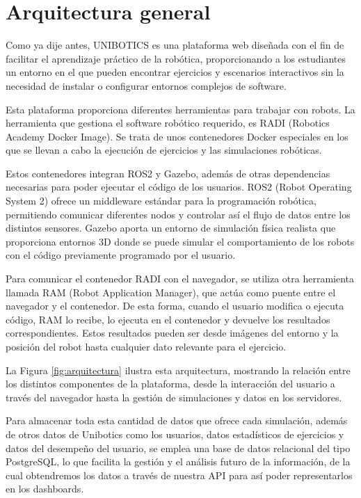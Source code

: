 \documentclass[a4paper, 12pt]{book}
\begin{document}
\section{Arquitectura general} 
\label{sec:arquitectura}

Como ya dije antes, UNIBOTICS es una plataforma web diseñada con el fin de facilitar el aprendizaje práctico de la robótica, proporcionando a los estudiantes un entorno en el que pueden encontrar ejercicios y escenarios interactivos sin la necesidad de instalar o configurar entornos complejos de software.

Esta plataforma proporciona diferentes herramientas para trabajar con robots. La herramienta que gestiona el software robótico requerido, es RADI (Robotics Academy Docker Image). Se trata de unos contenedores Docker especiales en los que se llevan a cabo la ejecución de ejercicios y las simulaciones robóticas.

Estos contenedores integran ROS2 y Gazebo, además de otras dependencias necesarias para poder ejecutar el código de los usuarios. ROS2 (Robot Operating System 2) ofrece un middleware estándar para la programación robótica, permitiendo comunicar diferentes nodos y controlar así el flujo de datos entre los distintos sensores. Gazebo aporta un entorno de simulación física realista que proporciona entornos 3D donde se puede simular el comportamiento de los robots con el código previamente programado por el usuario.

Para comunicar el contenedor RADI con el navegador, se utiliza otra herramienta llamada RAM (Robot Application Manager), que actúa como puente entre el navegador y el contenedor. De esta forma, cuando el usuario modifica o ejecuta código, RAM lo recibe, lo ejecuta en el contenedor y devuelve los resultados correspondientes. Estos resultados pueden ser desde imágenes del entorno y la posición del robot hasta cualquier dato relevante para el ejercicio.

La Figura \ref{fig:arquitectura} ilustra esta arquitectura, mostrando la relación entre los distintos componentes de la plataforma, desde la interacción del usuario a través del navegador hasta la gestión de simulaciones y datos en los servidores.

Para almacenar toda esta cantidad de datos que ofrece cada simulación, además de otros datos de Unibotics como los usuarios, datos estadísticos de ejercicios y datos del desempeño del usuario, se emplea una base de datos relacional del tipo PostgreSQL, lo que facilita la gestión y el análisis futuro de la información, de la cual obtendremos los datos a través de nuestra API para así poder representarlos en los dashboards.
\end{document}
